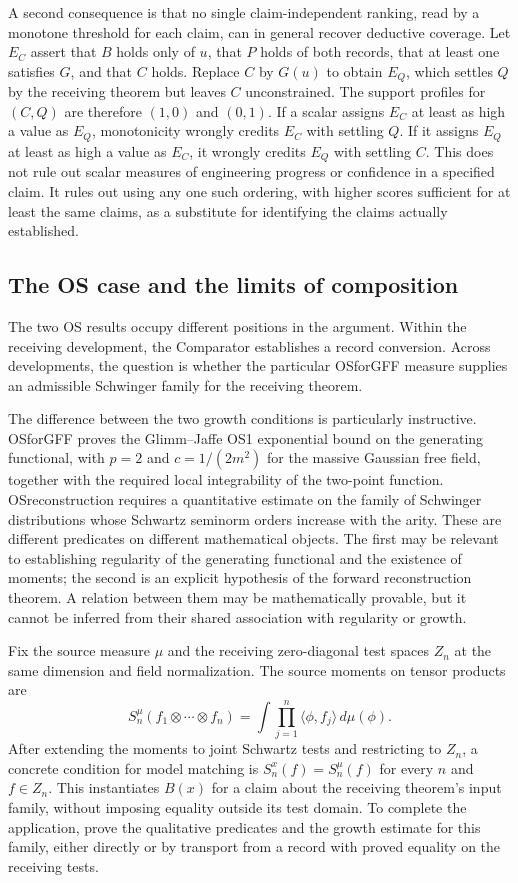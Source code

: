 \documentclass[pdflatex,sn-apa]{sn-jnl}
\begin{document}
A second consequence is that no single claim-independent ranking, read by a monotone threshold for each claim, can in general recover deductive coverage. Let \(E_C\) assert that \(B\) holds only of \(u\), that \(P\) holds of both records, that at least one satisfies \(G\), and that \(C\) holds. Replace \(C\) by \(G(u)\) to obtain \(E_Q\), which settles \(Q\) by the receiving theorem but leaves \(C\) unconstrained. The support profiles for \((C,Q)\) are therefore \((1,0)\) and \((0,1)\). If a scalar assigns \(E_C\) at least as high a value as \(E_Q\), monotonicity wrongly credits \(E_C\) with settling \(Q\). If it assigns \(E_Q\) at least as high a value as \(E_C\), it wrongly credits \(E_Q\) with settling \(C\). This does not rule out scalar measures of engineering progress or confidence in a specified claim. It rules out using any one such ordering, with higher scores sufficient for at least the same claims, as a substitute for identifying the claims actually established.


\subsection{The OS case and the limits of composition}

The two OS results occupy different positions in the argument. Within the receiving development, the Comparator establishes a record conversion. Across developments, the question is whether the particular OSforGFF measure supplies an admissible Schwinger family for the receiving theorem.

The difference between the two growth conditions is particularly instructive. OSforGFF proves the Glimm--Jaffe OS1 exponential bound on the generating functional, with \(p=2\) and \(c=1/(2m^2)\) for the massive Gaussian free field, together with the required local integrability of the two-point function. OSreconstruction requires a quantitative estimate on the family of Schwinger distributions whose Schwartz seminorm orders increase with the arity. These are different predicates on different mathematical objects. The first may be relevant to establishing regularity of the generating functional and the existence of moments; the second is an explicit hypothesis of the forward reconstruction theorem. A relation between them may be mathematically provable, but it cannot be inferred from their shared association with regularity or growth.

Fix the source measure \(\mu\) and the receiving zero-diagonal test spaces \(Z_n\) at the same dimension and field normalization. The source moments on tensor products are
\[
S_n^\mu(f_1\otimes\cdots\otimes f_n)
=\int\prod_{j=1}^{n}\langle\phi,f_j\rangle\,d\mu(\phi).
\]
After extending the moments to joint Schwartz tests and restricting to \(Z_n\), a concrete condition for model matching is \(S_n^x(f)=S_n^\mu(f)\) for every \(n\) and \(f\in Z_n\). This instantiates \(B(x)\) for a claim about the receiving theorem's input family, without imposing equality outside its test domain. To complete the application, prove the qualitative predicates and the growth estimate for this family, either directly or by transport from a record with proved equality on the receiving tests.
\end{document}
